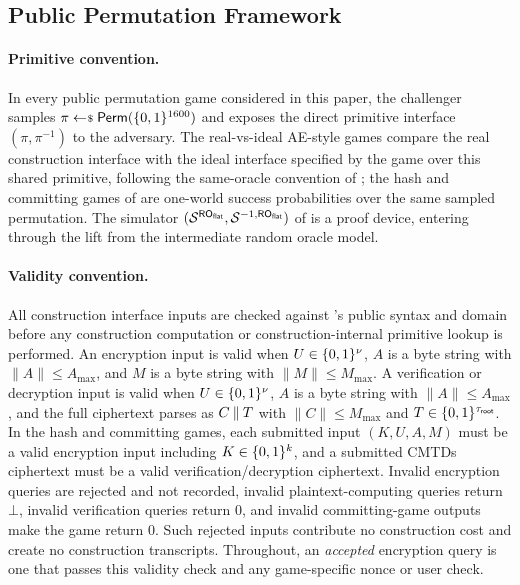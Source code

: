 \subsection{Public Permutation Framework}
\label{sec:games-pp}

\paragraph{Primitive convention.}
In every public permutation game considered in this paper, the challenger samples
$\pi \sample \Perm(\bits^{1600})$ and exposes the direct primitive
interface $(\pi, \pi^{-1})$ to the adversary. The real-vs-ideal AE-style
games compare the real construction interface with the ideal interface
specified by the game over this shared primitive, following the
same-oracle convention of \cite{BT16}; the hash and committing games of
 are one-world success probabilities over the same
sampled permutation. The simulator $(\mathcal{S}^{\mathsf{RO}_{\mathsf{flat}}},\mathcal{S}^{-1,\mathsf{RO}_{\mathsf{flat}}})$ of
 is a proof device, entering through the lift from
the intermediate random oracle model.

\paragraph{Validity convention.}
All construction interface inputs are checked against \TW{}'s public
syntax and domain before any construction computation or
construction-internal primitive lookup is performed. An encryption input
is valid when $U \in \{0,1\}^\nu$, $A$ is a byte string with
$\|A\| \leq A_{\max}$, and $M$ is a byte string with
$\|M\| \leq M_{\max}$. A verification or decryption input is valid when
$U \in \{0,1\}^\nu$, $A$ is a byte string with $\|A\| \leq A_{\max}$, and
the full ciphertext parses as $C \mathbin{\|} T$ with $\|C\| \leq M_{\max}$
and $T \in \{0,1\}^{\tau_{\mathsf{root}}}$. In the hash and committing games, each
submitted input $(K, U, A, M)$ must be a valid encryption input including
$K \in \{0,1\}^k$, and a submitted CMTDs ciphertext must be a valid
verification/decryption ciphertext. Invalid encryption queries
are rejected and not recorded, invalid plaintext-computing queries return
$\bot$, invalid verification queries return $0$, and invalid committing-game
outputs make the game return $0$. Such rejected inputs contribute no
construction cost and create no construction transcripts. Throughout, an
\emph{accepted} encryption query is one that passes this validity check and any
game-specific nonce or user check.

